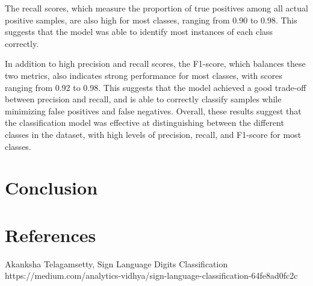 \documentclass[conference]{IEEEtran}
\begin{document}
The recall scores, which measure the proportion of true positives among all actual positive samples, are also high for most classes, ranging from 0.90 to 0.98. This suggests that the model was able to identify most instances of each class correctly.

In addition to high precision and recall scores, the F1-score, which balances these two metrics, also indicates strong performance for most classes, with scores ranging from 0.92 to 0.98. This suggests that the model achieved a good trade-off between precision and recall, and is able to correctly classify samples while minimizing false positives and false negatives.
Overall, these results suggest that the classification model was effective at distinguishing between the different classes in the dataset, with high levels of precision, recall, and F1-score for most classes.
\section{Conclusion}

\section{References}

\begin{thebibliography}{00}
     Akanksha Telagamsetty, Sign Language Digits Classification https://medium.com/analytics-vidhya/sign-language-classification-64fe8ad0fc2c
\end{thebibliography}
\end{document}
